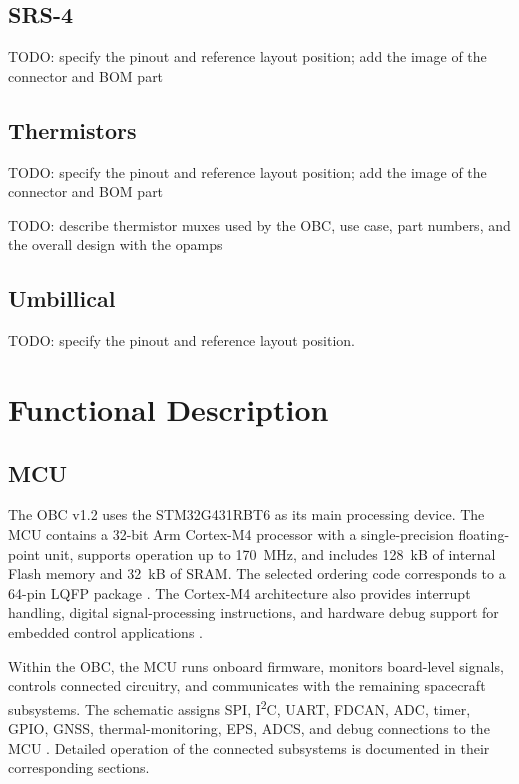 \documentclass[10pt]{../datasheet}
\begin{document}
\subsection{SRS-4}

TODO: specify the pinout and reference layout position; add the image of the
connector and BOM part

\subsection{Thermistors}

TODO: specify the pinout and reference layout position; add the image of the
connector and BOM part

TODO: describe thermistor muxes used by the OBC, use case, part numbers, and the
overall design with the opamps

\subsection{Umbillical}

TODO: specify the pinout and reference layout position.

\section{Functional Description}

\subsection{MCU}

The OBC v1.2 uses the STM32G431RBT6 as its main processing device. The MCU
contains a 32-bit Arm Cortex-M4 processor with a single-precision floating-point
unit, supports operation up to 170~MHz, and includes 128~kB of internal Flash
memory and 32~kB of SRAM. The selected ordering code corresponds to a 64-pin
LQFP package \cite{stm32g431-datasheet}. The Cortex-M4 architecture also
provides interrupt handling, digital signal-processing instructions, and
hardware debug support for embedded control applications
\cite{arm-cortex-m4}.

Within the OBC, the MCU runs onboard firmware, monitors board-level signals,
controls connected circuitry, and communicates with the remaining spacecraft
subsystems. The schematic assigns SPI, I\textsuperscript{2}C, UART, FDCAN, ADC,
timer, GPIO, GNSS, thermal-monitoring, EPS, ADCS, and debug connections to the
MCU \cite{obc-schematic}. Detailed operation of the connected subsystems is
documented in their corresponding sections.
\end{document}
